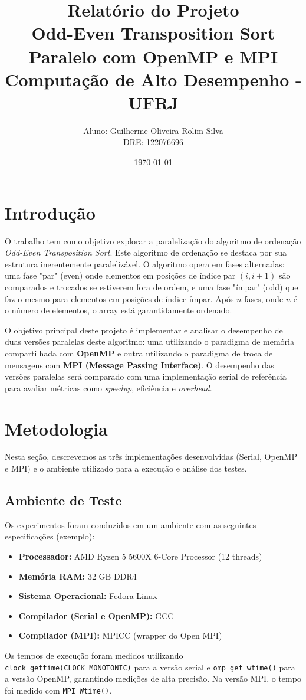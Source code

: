 \documentclass[12pt, a4paper]{article}
\title{
    \textbf{Relatório do Projeto} \\
    \vspace{0.2cm}
    \large Odd-Even Transposition Sort Paralelo com OpenMP e MPI \\
    \large Computação de Alto Desempenho - UFRJ
}
\author{
    Aluno: Guilherme Oliveira Rolim Silva \\
    DRE: 122076696
}
\date{\today}
\begin{document}
\maketitle
\thispagestyle{empty}

\section{Introdução}

O trabalho tem como objetivo explorar a paralelização do algoritmo de ordenação \textit{Odd-Even Transposition Sort}. Este algoritmo de ordenação se destaca por sua estrutura inerentemente paralelizável. O algoritmo opera em fases alternadas: uma fase "par" (even) onde elementos em posições de índice par $(i, i+1)$ são comparados e trocados se estiverem fora de ordem, e uma fase "ímpar" (odd) que faz o mesmo para elementos em posições de índice ímpar. Após $n$ fases, onde $n$ é o número de elementos, o array está garantidamente ordenado.

O objetivo principal deste projeto é implementar e analisar o desempenho de duas versões paralelas deste algoritmo: uma utilizando o paradigma de memória compartilhada com \textbf{OpenMP} e outra utilizando o paradigma de troca de mensagens com \textbf{MPI (Message Passing Interface)}. O desempenho das versões paralelas será comparado com uma implementação serial de referência para avaliar métricas como \textit{speedup}, eficiência e \textit{overhead}.

\section{Metodologia}

Nesta seção, descrevemos as três implementações desenvolvidas (Serial, OpenMP e MPI) e o ambiente utilizado para a execução e análise dos testes.

\subsection{Ambiente de Teste}
Os experimentos foram conduzidos em um ambiente com as seguintes especificações (exemplo):
\begin{itemize}
    \item \textbf{Processador:} AMD Ryzen 5 5600X 6-Core Processor (12 threads)
    \item \textbf{Memória RAM:} 32 GB DDR4
    \item \textbf{Sistema Operacional:} Fedora Linux
    \item \textbf{Compilador (Serial e OpenMP):} GCC
    \item \textbf{Compilador (MPI):} MPICC (wrapper do Open MPI)
\end{itemize}
Os tempos de execução foram medidos utilizando \texttt{clock\_gettime(CLOCK\_MONOTONIC)} para a versão serial e \texttt{omp\_get\_wtime()} para a versão OpenMP, garantindo medições de alta precisão. Na versão MPI, o tempo foi medido com \texttt{MPI\_Wtime()}.
\end{document}

